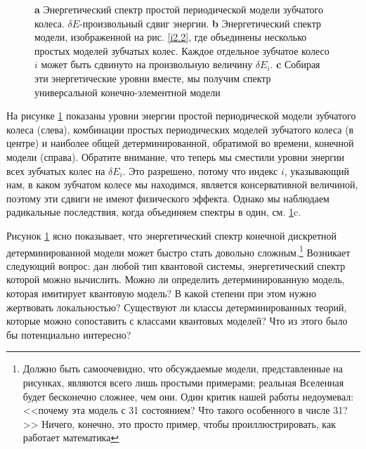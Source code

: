 \documentclass[main.tex]{subfiles}
\begin{document}
\begin{figure}[ht] %
	\begin{center}
		\caption{
		\label{i2.3} \textbf{a} Энергетический спектр простой периодической модели зубчатого колеса. $\delta E$-произвольный сдвиг энергии. \textbf{b} Энергетический спектр модели, изображенной на рис. \ref{i2.2}, где объединены несколько простых моделей зубчатых колес. Каждое отдельное зубчатое колесо $i$ может быть сдвинуто на произвольную величину $\delta E_i$. \textbf{c} Собирая эти энергетические уровни вместе, мы получим спектр универсальной конечно-элементной модели}
	\end {center}
\end {figure}

На рисунке \ref{i2.3} показаны уровни энергии простой периодической модели зубчатого колеса (слева), комбинации простых периодических моделей зубчатого колеса (в центре) и наиболее общей детерминированной, обратимой во времени, конечной модели (справа). Обратите внимание, что теперь мы сместили уровни энергии всех зубчатых колес на $\delta E_i$. Это разрешено, потому что индекс $i$, указывающий нам, в каком зубчатом колесе мы находимся, является консервативной величиной, поэтому эти сдвиги не имеют физического эффекта. Однако мы наблюдаем радикальные последствия, когда объединяем спектры в один, см. \ref{i2.3}c.

Рисунок \ref{i2.3} ясно показывает, что энергетический спектр конечной дискретной детерминированной модели может быстро стать довольно сложным.\footnote{Должно быть самоочевидно, что обсуждаемые модели, представленные на рисунках, являются всего лишь простыми примерами; реальная Вселенная будет бесконечно сложнее, чем они. Один критик нашей работы недоумевал: <<почему эта модель с 31 состоянием? Что такого особенного в числе 31?>> Ничего, конечно, это просто пример, чтобы проиллюстрировать, как работает математика} Возникает следующий вопрос: дан любой тип квантовой системы, энергетический спектр которой можно вычислить. Можно ли определить детерминированную модель, которая имитирует квантовую модель? В какой степени при этом нужно жертвовать локальностью? Существуют ли классы детерминированных теорий, которые можно сопоставить с классами квантовых моделей? Что из этого было бы потенциально интересно?
\end{document}
